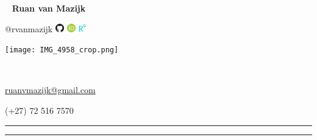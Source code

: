 \begin{multicols}{3}
  \
  \vfill
  \raggedleft
    {\Large \textbf{Ruan van Mazijk}} \par
    {\large @rvanmazijk}
    \href{https://github.com/rvanmazijk}
         {\includegraphics[width=1em]{logos/GitHub.png}}
    \href{https://orcid.org/0000-0003-2659-6909}
         {\includegraphics[width=1em]{logos/ORCID.png}}
    \href{https://www.researchgate.net/profile/Ruan-Van-Mazijk}
         {\includegraphics[width=1em]{logos/ResearchGate-white_crop.jpg}}
  \vfill
  \
  
  \columnbreak
  \begin{center}
    \texttt{[image: IMG\_4958\_crop.png]}
  \end{center}
  \columnbreak
  \par
  
  \
  \vfill
  \raggedright
    {\large \href{mailto:ruanvmazijk@gmail.com}{ruanvmazijk@gmail.com}} \par
    (+27) 72 516 7570
  \vfill
  \
\end{multicols}

\hrule \vskip2pt \hrule
